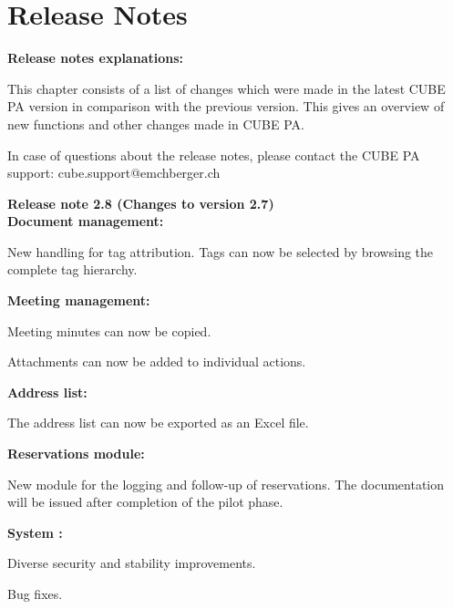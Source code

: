 
\clearpage
\section{Release Notes}

\textbf{Release notes explanations:}

\vspace{\baselineskip}

This chapter consists of a list of changes which were made in the latest CUBE PA version in comparison with the previous version. This gives an overview of new functions and other changes made in CUBE PA.

\vspace{\baselineskip}

In case of questions about the release notes, please contact the CUBE PA support: {\color{red} cube.support@emchberger.ch}

\vspace{\baselineskip}

\textbf{Release note 2.8 (Changes to version 2.7)} \\
\textbf{Document management:}
\begin{compactitem}
	\item New handling for tag attribution. Tags can now be selected by browsing the complete tag hierarchy.
\end{compactitem}
\textbf{Meeting management:}
\begin{compactitem}
	\item Meeting minutes can now be copied.
	\item Attachments can now be added to individual actions.
\end{compactitem}
\textbf{Address list:}
\begin{compactitem}
	\item The address list can now be exported as an Excel file.
\end{compactitem}
\textbf{Reservations module:}
\begin{compactitem}
	\item New module for the logging and follow-up of reservations. The documentation will be issued after completion of the pilot phase.
\end{compactitem}
\textbf{System :}
\begin{compactitem}
	\item Diverse security and stability improvements.
	\item Bug fixes.
\end{compactitem}
\vspace{\baselineskip}

